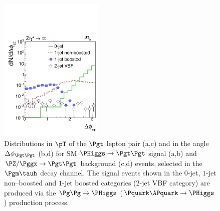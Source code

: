 \begin{figure}
\begin{center}
\includegraphics*[height=70mm]{plots_sept_16/DYJets_dPhiTauTau_muhad.pdf}
\end{center}
\caption{
  Distributions in $\pT$ of the $\Pgt$ lepton pair (a,c) and in the
  angle $\Delta\phi_{\Pgt\Pgt}$ (b,d) for SM $\PHiggs \to \Pgt\Pgt$ signal (a,b)
  and $\PZ/\Pggx \to \Pgt\Pgt$ background (c,d) events,
  selected in the $\Pgm\tauh$ decay channel.
  The signal events shown in the $0$-jet, $1$-jet non--boosted and
  $1$-jet boosted categories ($2$-jet VBF category) are produced via the $\Pg\Pg \to \PHiggs$
  ($\Pquark\APquark \to \PHiggs$) production process.   
}
\label{fig:ditau_pT_and_dphi}
\end{figure}


